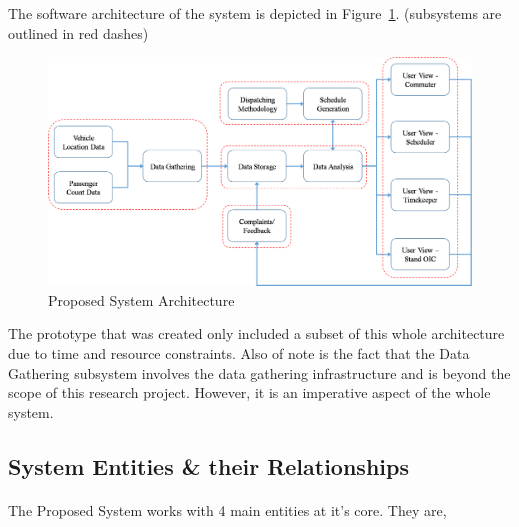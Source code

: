 The software architecture of the system is depicted in Figure~\ref{image-proposedSystemArchitecture}. (subsystems are outlined in red dashes)

\begin {figure} [h!]
\centering
\includegraphics [scale=0.45] {proposedSystemArchitecture}
\caption [Proposed System Architecture] {Proposed System Architecture}
\label {image-proposedSystemArchitecture}
\end {figure}

The prototype that was created only included a subset of this whole architecture due to time and resource constraints. Also of note is the fact that the Data Gathering subsystem involves the data gathering infrastructure and is beyond the scope of this research project. However, it is an imperative aspect of the whole system.

\subsection{System Entities \& their Relationships}

\paragraph{} The Proposed System works with 4 main entities at it's core. They are,

